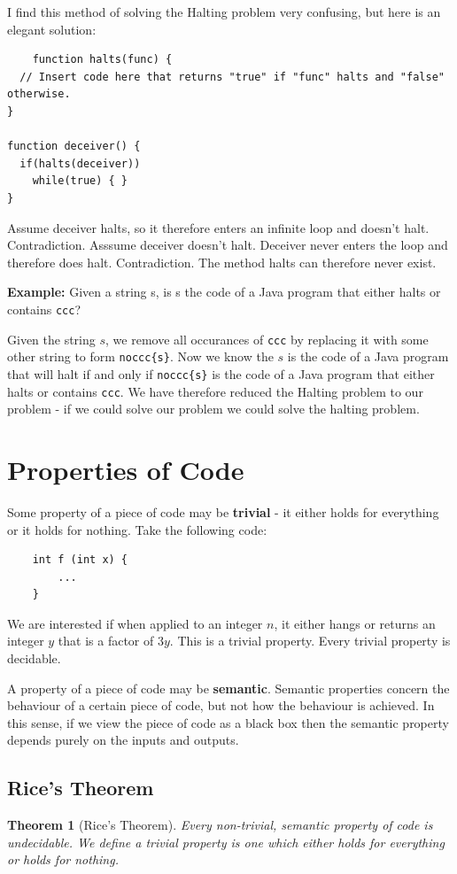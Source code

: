 \documentclass[11pt]{article}
\newtheorem{theorem}{Theorem}
\begin{document}
	I find this method of solving the Halting problem very confusing, but here is an elegant solution: 
	\begin{verbatim}
	function halts(func) {
  // Insert code here that returns "true" if "func" halts and "false" otherwise.
}

function deceiver() {
  if(halts(deceiver))
    while(true) { }
}
	\end{verbatim}
		
	Assume deceiver halts, so it therefore enters an infinite loop and doesn't halt. Contradiction. Asssume deceiver doesn't halt. Deceiver never enters the loop and therefore does halt. Contradiction. The method halts can therefore never exist.
	
	\par 
	\textbf{Example:} Given a string s, is s the code of a Java program that either halts or contains \texttt{ccc}? 
	\par 
	Given the string $s$, we remove all occurances of \texttt{ccc} by replacing it with some other string to form \texttt{noccc\{s\}}. Now we know the $s$ is the code of a Java program that will halt if and only if \texttt{noccc\{s\}} is the code of a Java program that either halts or contains \texttt{ccc}. We have therefore reduced the Halting problem to our problem - if we could solve our problem we could solve the halting problem.
	\section{Properties of Code}
	Some property of a piece of code may be \textbf{trivial} - it either holds for everything or it holds for nothing. Take the following code:
	
	\begin{verbatim}
	int f (int x) {
	    ...
	}
	\end{verbatim}
	
	We are interested if when applied to an integer $n$, it either hangs or returns an integer $y$ that is a factor of $3y$. This is a trivial property. Every trivial property is decidable.
	
	A property of a piece of code may be \textbf{semantic}. Semantic properties concern the behaviour of a certain piece of code, but not how the behaviour is achieved. In this sense, if we view the piece of code as a black box then the semantic property depends purely on the inputs and outputs.
	
	\subsection{Rice's Theorem}
	\begin{theorem}[Rice's Theorem]
		Every non-trivial, semantic property of code is undecidable. We define a trivial property is one which either holds for everything or holds for nothing.
	\end{theorem}
\end{document}
